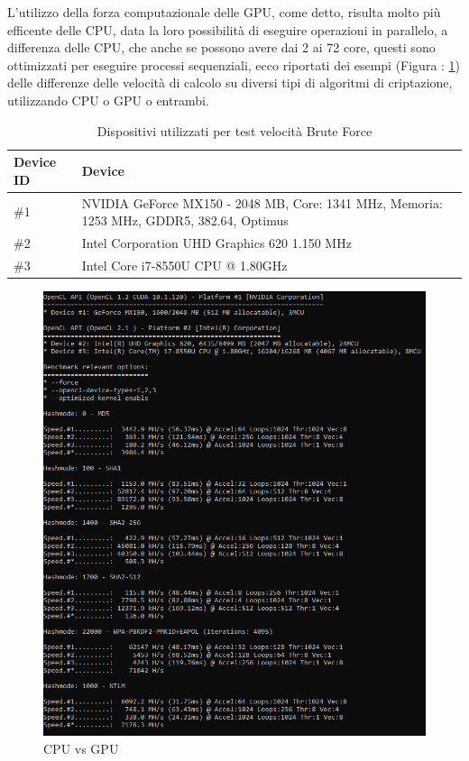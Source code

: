 \newpage

L'utilizzo della forza computazionale delle GPU, come detto, risulta molto più efficente delle CPU, data la loro possibilità di eseguire operazioni in parallelo, a differenza delle CPU, che anche se possono avere dai 2 ai 72 core, questi sono ottimizzati per eseguire processi sequenziali, ecco riportati dei esempi (Figura : \ref{fig:CPU vs GPU}) delle differenze delle velocità di calcolo su diversi tipi di algoritmi di criptazione, utilizzando CPU o GPU o entrambi.
\newline

\begin{table}[htbp]
    \begin{center}
    \begin{tabular}{|l|p{9cm}|}
    \hline
    \textbf{Device ID} & \textbf{Device} \\
    \hline
    \#1 & NVIDIA GeForce MX150 - 2048 MB, Core: 1341 MHz, Memoria: 1253 MHz, GDDR5, 382.64, Optimus\\
    \hline
    \#2 & Intel Corporation UHD Graphics 620 1.150 MHz \\
    \hline
    \#3 & Intel Core i7-8550U CPU @ 1.80GHz\\
    \hline
    \end{tabular}
    \end{center}
    \caption{Dispositivi utilizzati per test velocità Brute Force}
    \label{tab:browser}
    \end{table}

\begin{figure}[ht]
    \centering
    \includegraphics[width=\linewidth]{Immagini/7/cpu_gpu.PNG}
    \caption{CPU vs GPU}
    \label{fig:CPU vs GPU}
\end{figure}

\label{chap:conc}